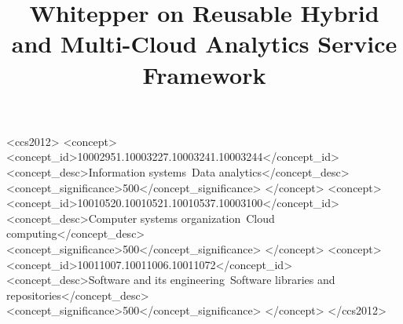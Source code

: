 \documentclass[sigconf,preprint]{acmart}
\begin{document}
\newpage

\title{Whitepper on Reusable Hybrid and Multi-Cloud Analytics Service Framework}



\maketitle

\tableofcontents
\newpage






\begin{CCSXML}
<ccs2012>
   <concept>
       <concept_id>10002951.10003227.10003241.10003244</concept_id>
       <concept_desc>Information systems~Data analytics</concept_desc>
       <concept_significance>500</concept_significance>
       </concept>
   <concept>
       <concept_id>10010520.10010521.10010537.10003100</concept_id>
       <concept_desc>Computer systems organization~Cloud computing</concept_desc>
       <concept_significance>500</concept_significance>
       </concept>
   <concept>
       <concept_id>10011007.10011006.10011072</concept_id>
       <concept_desc>Software and its engineering~Software libraries and repositories</concept_desc>
       <concept_significance>500</concept_significance>
       </concept>
 </ccs2012>
\end{CCSXML}











\newpage

\maketitle

% 








\end{document}
